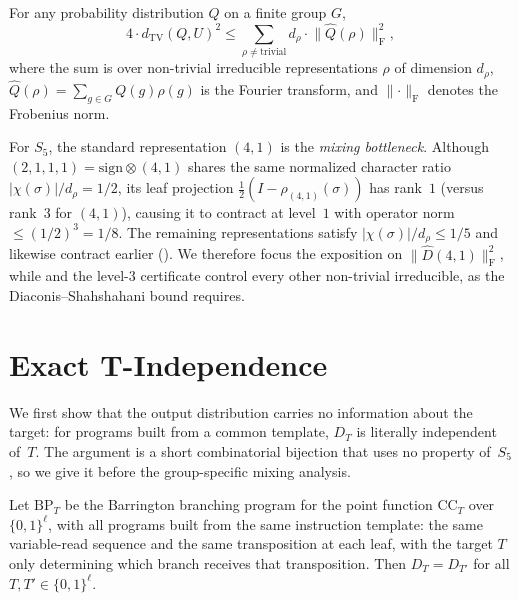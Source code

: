 \documentclass[version=final]{iacrcc}
\newcommand{\norm}[1]{\lVert #1 \rVert}
\newcommand{\abs}[1]{\lvert #1 \rvert}
\newcommand{\frob}[1]{\norm{#1}_{\mathrm{F}}}
\newcommand{\dtv}{d_{\mathrm{TV}}}
\newcommand{\Dhat}{\widehat{D}}
\newcommand{\CC}{\mathrm{CC}}
\newcommand{\BP}{\mathrm{BP}}
\begin{document}
\begin{theorem}
\label{thm:ds}
For any probability distribution $Q$ on a finite group $G$,
\[
4 \cdot \dtv(Q, U)^2 \leq \sum_{\rho \neq \mathrm{trivial}}
d_\rho \cdot \frob{\widehat{Q}(\rho)}^2,
\]
where the sum is over non-trivial irreducible representations $\rho$ of
dimension $d_\rho$, $\widehat{Q}(\rho) = \sum_{g \in G} Q(g) \rho(g)$ is the
Fourier transform, and $\frob{\cdot}$ denotes the Frobenius norm.
\end{theorem}

For $S_5$, the standard representation $(4,1)$ is the \emph{mixing
bottleneck}. Although $(2,1,1,1) = \mathrm{sign} \otimes (4,1)$ shares the
same normalized character ratio $\abs{\chi(\sigma)}/d_\rho = 1/2$, its leaf
projection $\frac{1}{2}(I - \rho_{(4,1)}(\sigma))$ has rank~$1$ (versus
rank~$3$ for $(4,1)$), causing it to contract at level~$1$ with operator
norm $\leq (1/2)^3 = 1/8$. The remaining representations satisfy
$\abs{\chi(\sigma)}/d_\rho \leq 1/5$ and likewise contract earlier
(). We therefore focus the exposition on
$\frob{\Dhat(4,1)}^2$, while  and the level-$3$
certificate control every other non-trivial irreducible, as the
Diaconis--Shahshahani bound requires.


\section{Exact T-Independence}
\label{sec:t-indep}

We first show that the output distribution carries no information about the
target: for programs built from a common template, $D_T$ is literally
independent of~$T$. The argument is a short combinatorial bijection that uses no
property of~$S_5$, so we give it before the group-specific mixing analysis.

\begin{theorem}[T-Independence]
\label{thm:t-indep}
Let $\BP_T$ be the Barrington branching program for the point function $\CC_T$
over $\{0,1\}^\ell$, with all programs built from the same instruction template:
the same variable-read sequence and the same transposition at each leaf, with the
target $T$ only determining which branch receives that transposition. Then
$D_T = D_{T'}$ for all $T, T' \in \{0,1\}^\ell$.
\end{theorem}
\end{document}
